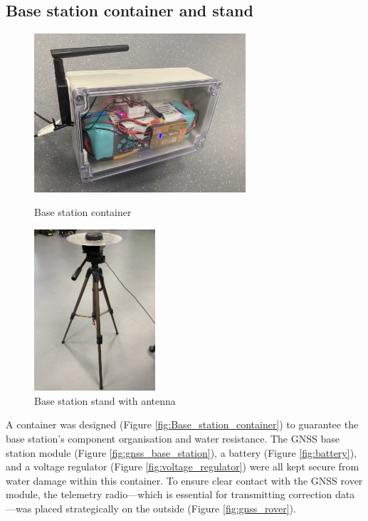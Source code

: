 \documentclass{report}
\begin{document}
\subsection{Base station container and stand}
\begin{figure}[H]
  \begin{minipage}{.5\textwidth}
    \centering
    \includegraphics[width=0.7\textwidth]{Pictures/base_station_box.png}
    \caption{Base station container}
    \label{fig:Base_station_container}
  \end{minipage}
  \begin{minipage}{.5\textwidth}
    \centering
    \includegraphics[width=0.4\textwidth]{Pictures/base_station_stand.jpg}
    \caption{Base station stand with antenna}
    \label{fig:Base_station_stand}
  \end{minipage}
\end{figure}
A container was designed (Figure \ref{fig:Base_station_container}) to guarantee
the base station's component organisation and water resistance. The GNSS base
station module (Figure \ref{fig:gnss_base_station}), a battery
(Figure \ref{fig:battery}), and a voltage regulator
(Figure \ref{fig:voltage_regulator}) were all kept secure from water damage
within this container. To ensure clear contact with the GNSS rover module, the
telemetry radio—which is essential for transmitting correction data—was placed
strategically on the outside (Figure \ref{fig:gnss_rover}).
\end{document}
